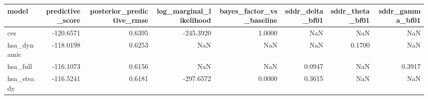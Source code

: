\begin{tabular}{lrrrrrrr}
\toprule
model & predictive\_score & posterior\_predictive\_rmse & log\_marginal\_likelihood & bayes\_factor\_vs\_baseline & sddr\_delta\_bf01 & sddr\_theta\_bf01 & sddr\_gamma\_bf01 \\
\midrule
ces & -120.6571 & 0.6395 & -245.3920 & 1.0000 & NaN & NaN & NaN \\
hsa\_dynamic & -118.0198 & 0.6253 & NaN & NaN & NaN & 0.1700 & NaN \\
hsa\_full & -116.1073 & 0.6156 & NaN & NaN & 0.0947 & NaN & 0.3917 \\
hsa\_steady & -116.5241 & 0.6181 & -297.6572 & 0.0000 & 0.3615 & NaN & NaN \\
\bottomrule
\end{tabular}
